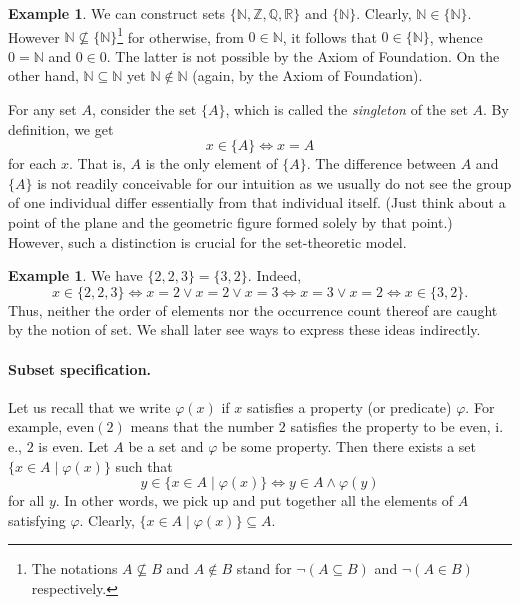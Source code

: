 \documentclass[12pt,notitlepage]{article}
\theoremstyle{plain}
\theoremstyle{definition}
\newtheorem{exm}[thm]{Example}
\theoremstyle{plain}
\newcommand{\N}{\mathbb{N}}
\newcommand{\Z}{\mathbb{Z}}
\newcommand{\Q}{\mathbb{Q}}
\newcommand{\R}{\mathbb{R}}
\newcommand{\sbs}{\subseteq}
\renewcommand{\phi}{\varphi}
\newcommand{\1}{\mathbf{1}}
\newcommand{\0}{\mathbf{0}}
\newcommand{\mcomm}[1]{}
\begin{document}
\mcomm{Of course, there is no \emph{logical} necessity in turning the Axiom of Pairing into a schema for various $n \in \N$ as $\{a, b, c\} = \cup \{ \{a, b\}, \{ c, c \} \}$. Yet this observation uses the union essentially; so we have here preferred a freshman's comfort to logical elegance.}
\begin{exm}
We can construct sets $\{\N, \Z,\Q,\R\}$ and $\{ \N \}$. Clearly, $\N \in \{\N\}$. However $\N \not \sbs \{\N\}$\footnote{The notations $A \not\sbs B$ and $A \notin B$ stand for $\neg (A \sbs B)$ and $\neg (A \in B)$ respectively.} for otherwise, from $0 \in \N$, it follows that $0 \in \{\N\}$, whence $0 = \N$ and $0 \in 0$. The latter is not possible by the Axiom of Foundation. On the other hand, $\N \sbs \N$ yet $\N \notin \N$ (again, by the Axiom of Foundation).
\end{exm}

For any set $A$, consider the set $\{A\}$, which is called the \emph{singleton} of the set $A$. By definition, we get
$$x \in \{ A \} \iff x = A$$
for each $x$. That is, $A$ is the only element of $\{ A \}$. The difference between $A$ and $\{A\}$ is not  readily conceivable for our intuition as we usually do not see the group of one individual differ essentially from that individual itself. (Just think about a point of the plane and the geometric figure formed solely by that point.) However, such a distinction is crucial for the set-theoretic model.

\begin{exm}
We have $\{2,2,3\} = \{3,2\}$. Indeed, 
$$x \in \{2,2,3\} \iff x = 2 \vee x = 2 \vee x = 3 \iff x = 3 \vee x = 2 \iff x \in \{3,2\}.$$
Thus, neither the order of elements nor the occurrence count thereof are caught by the notion of set. We shall later see ways to express these ideas indirectly.
\end{exm}

\paragraph{Subset specification.}  Let us recall that we write $\phi(x)$ if $x$ satisfies a property (or predicate) $\phi$. For example, $\mbox{even}(2)$ means that the number $2$ satisfies the property to be even, i.\,e., $2$ is even. Let $A$ be a set and $\phi$ be some property. Then there exists a set $\{ x \in A \mid \phi(x) \}$ such that
$$y \in \{ x \in A \mid \phi(x) \} \iff y \in A \wedge \phi(y)$$
for all $y$. In other words, we pick up and put together all the elements of $A$ satisfying $\phi$.  Clearly, $\{ x \in A \mid \phi(x) \} \sbs A$.
\end{document}
